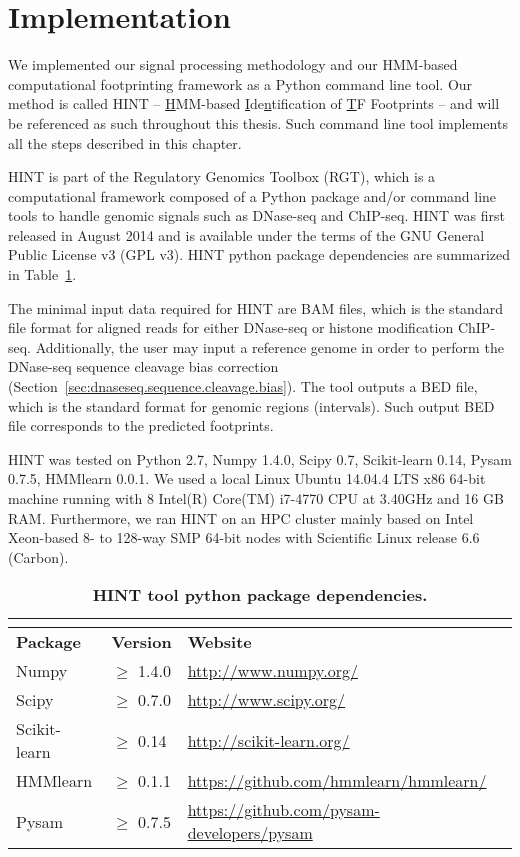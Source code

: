 \section{Implementation}
\label{sec:implementation}

We implemented our signal processing methodology and our HMM-based computational footprinting framework as a Python command line tool. Our method is called HINT -- \underline{H}MM-based \underline{I}de\underline{n}tification of \underline{T}F Footprints -- and will be referenced as such throughout this thesis. Such command line tool implements all the steps described in this chapter.

HINT is part of the Regulatory Genomics Toolbox (RGT), which is a computational framework composed of a Python package and/or command line tools to handle genomic signals such as DNase-seq and ChIP-seq. HINT was first released in August 2014 and is available under the terms of the GNU General Public License v3 (GPL v3). HINT python package dependencies are summarized in Table~\ref{tab:package.dependency}.

The minimal input data required for HINT are BAM files, which is the standard file format for aligned reads for either DNase-seq or histone modification ChIP-seq. Additionally, the user may input a reference genome in order to perform the DNase-seq sequence cleavage bias correction (Section~\ref{sec:dnaseseq.sequence.cleavage.bias}). The tool outputs a BED file, which is the standard format for genomic regions (intervals). Such output BED file corresponds to the predicted footprints.

HINT was tested on Python 2.7, Numpy 1.4.0, Scipy 0.7, Scikit-learn 0.14, Pysam 0.7.5, HMMlearn 0.0.1. We used a local Linux Ubuntu 14.04.4 LTS x86 64-bit machine running with 8 Intel(R) Core(TM) i7-4770 CPU at 3.40GHz and 16 GB RAM. Furthermore, we ran HINT on an HPC cluster mainly based on Intel Xeon-based 8- to 128-way SMP 64-bit nodes with Scientific Linux release 6.6 (Carbon).

\begin{longtable}{>{\raggedright\arraybackslash}p{2.5cm}>{\raggedright\arraybackslash}p{1.2cm}>{\raggedright\arraybackslash}p{9.8cm}}
\caption[HINT tool python package dependencies]{\textbf{HINT tool python package dependencies.}} \\
\label{tab:package.dependency} \\
  \hline
  \textbf{Package} & \textbf{Version} & \textbf{Website} \\
  \hline
  Numpy & $\geq$ 1.4.0 & \url{http://www.numpy.org/} \\
  Scipy & $\geq$ 0.7.0 & \url{http://www.scipy.org/} \\
  Scikit-learn & $\geq$ 0.14 & \url{http://scikit-learn.org/} \\
  HMMlearn & $\geq$ 0.1.1 & \url{https://github.com/hmmlearn/hmmlearn/} \\
  Pysam & $\geq$ 0.7.5 & \url{https://github.com/pysam-developers/pysam} \\
  \hline
\end{longtable}

